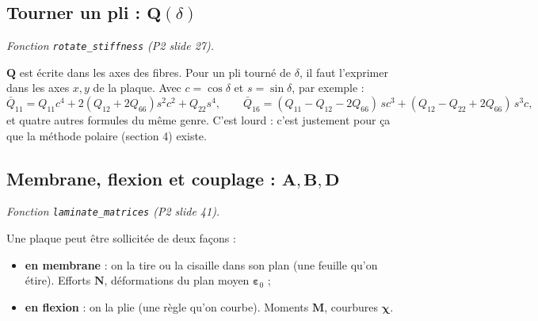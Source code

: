\documentclass[11pt,a4paper]{article}
\newcommand{\Q}{\mathbf{Q}}
\newcommand{\code}[1]{\texttt{#1}}
\begin{document}
\subsection{Tourner un pli : \texorpdfstring{$\Q(\delta)$}{Q(delta)}}
\emph{Fonction \code{rotate\_stiffness} (P2 slide 27).}

$\Q$ est écrite dans les axes des fibres. Pour un pli tourné de $\delta$, il
faut l'exprimer dans les axes $x, y$ de la plaque. Avec $c = \cos\delta$ et
$s = \sin\delta$, par exemple :
\[
\bar Q_{11} = Q_{11}c^4 + 2(Q_{12}+2Q_{66})s^2c^2 + Q_{22}s^4,
\qquad
\bar Q_{16} = (Q_{11}-Q_{12}-2Q_{66})\,s c^3 + (Q_{12}-Q_{22}+2Q_{66})\,s^3 c,
\]
et quatre autres formules du même genre. C'est lourd : c'est justement pour
ça que la méthode polaire (section 4) existe.

\subsection{Membrane, flexion et couplage : \texorpdfstring{$\mathbf{A}, \mathbf{B}, \mathbf{D}$}{A, B, D}}
\emph{Fonction \code{laminate\_matrices} (P2 slide 41).}

Une plaque peut être sollicitée de deux façons :
\begin{itemize}
  \item \textbf{en membrane} : on la tire ou la cisaille dans son plan (une
        feuille qu'on étire). Efforts $\mathbf{N}$, déformations du plan
        moyen $\boldsymbol{\varepsilon}_0$ ;
  \item \textbf{en flexion} : on la plie (une règle qu'on courbe). Moments
        $\mathbf{M}$, courbures $\boldsymbol{\chi}$.
\end{itemize}
\end{document}
